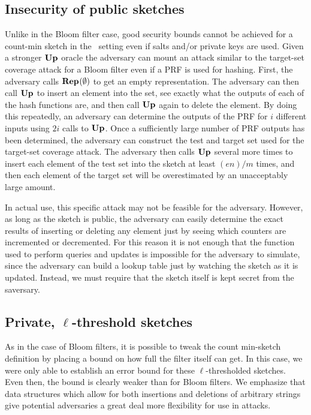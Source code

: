 \subsection{Insecurity of public sketches}

Unlike in the Bloom filter case, good security bounds cannot be achieved for a
count-min sketch in the \errep\ setting even if salts and/or private keys are
used. Given a stronger $\textup{\textbf{Up}}\hspace{0.5pt}$ oracle  the adversary can mount
an attack similar to the target-set coverage attack for a Bloom filter even if a
PRF is used for
hashing. First, the adversary calls $\textup{\textbf{Rep}}\hspace{0.5pt}(\emptyset)$ to get an empty
representation. The adversary can then call $\textup{\textbf{Up}}\hspace{0.5pt}$ to insert an element into the
set, see exactly what the outputs of each of the hash functions are, and then
call $\textup{\textbf{Up}}\hspace{0.5pt}$ again to delete the element. By doing this repeatedly, an adversary
can determine the outputs of the PRF for $i$ different inputs using $2i$ calls
to $\textup{\textbf{Up}}\hspace{0.5pt}$. Once a sufficiently large number of PRF outputs has been determined,
the adversary can construct the test and target set used for the target-set
coverage attack. The adversary then calls $\textup{\textbf{Up}}\hspace{0.5pt}$ several more times to insert
each element of the test set into the sketch at least $(en)/m$ times, and then
each element of the target set will be overestimated by an unacceptably large
amount.

In actual use, this specific attack may not be feasible for the adversary.
However, as long as the sketch is public, the adversary can easily determine the
exact results of inserting or deleting any element just by seeing which counters
are incremented or decremented. For this reason it is not enough that the
function used to perform queries and updates is impossible for the adversary to
simulate, since the adversary can build a lookup table just by watching the
sketch as it is updated. Instead, we must require that the sketch itself is kept
secret from the saversary.

\subsection{Private, $\ell$-threshold sketches}

As in the case of Bloom filters, it is possible to tweak the count min-sketch
definition by placing a bound on how full the filter itself can get. In this
case, we were only able to establish an error bound for these $\ell$-thresholded
sketches. Even then, the bound is clearly weaker than for Bloom filters. We
emphasize that data structures which allow for both insertions and deletions of
arbitrary strings give potential adversaries a great deal more flexibility for
use in attacks.

